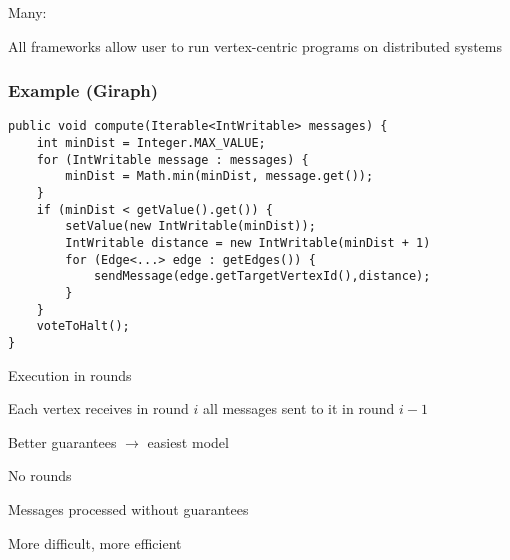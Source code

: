 {
    Many:
    
    
    All frameworks allow user to run vertex-centric programs on distributed systems

}


\begin{frame}[fragile]
\frametitle{Example (Giraph)}

\lstset{language=java,keepspaces=true}
\footnotesize
\begin{lstlisting}
public void compute(Iterable<IntWritable> messages) {
    int minDist = Integer.MAX_VALUE; 
    for (IntWritable message : messages) {
        minDist = Math.min(minDist, message.get());
    }
    if (minDist < getValue().get()) {
        setValue(new IntWritable(minDist));
        IntWritable distance = new IntWritable(minDist + 1)
        for (Edge<...> edge : getEdges()) {
            sendMessage(edge.getTargetVertexId(),distance);
        }
    }
    voteToHalt();
}
\end{lstlisting}

\end{frame}

{
}


{
	{
		{
			\item Execution in rounds
			\item Each vertex receives in round $i$ all messages sent to it in round $i-1$
			\item Better guarantees $\rightarrow$ easiest model
		}
	}{}{
		{
			\item No rounds
			\item Messages processed without guarantees
			\item More difficult, more efficient			
		}
	
	}
}

